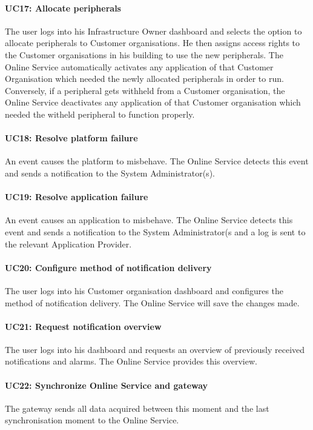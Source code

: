 \documentclass[english]{sareport}
\begin{document}
\paragraph{UC17: Allocate peripherals}
The user logs into his Infrastructure Owner dashboard and selects the option to allocate peripherals to Customer organisations. He then assigns access rights to the Customer organisations in his building to use the new peripherals. The Online Service automatically activates any application of that Customer Organisation which needed the newly allocated peripherals in order to run. Conversely, if a peripheral gets withheld from a Customer organisation, the Online Service deactivates any application of that Customer organisation which needed the witheld peripheral to function properly.

\paragraph{UC18: Resolve platform failure}
An event causes the platform to misbehave. The Online Service detects this event and sends a notification to the System Administrator(s).

\paragraph{UC19: Resolve application failure}
An event causes an application to misbehave. The Online Service detects this event and sends a notification to the System Administrator(s and a log is sent to the relevant Application Provider.

\paragraph{UC20: Configure method of notification delivery}
The user logs into his Customer organisation dashboard and configures the method of notification delivery. The Online Service will save the changes made.

\paragraph{UC21: Request notification overview}
The user logs into his dashboard and requests an overview of previously received notifications and alarms. The Online Service provides this overview.

\paragraph{UC22: Synchronize Online Service and gateway}
The gateway sends all data acquired between this moment and the last synchronisation moment to the Online Service.
\end{document}
